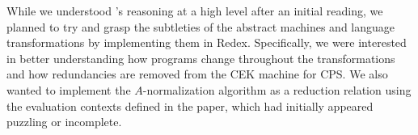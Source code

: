 \documentclass[11pt]{article}
\begin{document}



While we understood \citeauthor{Flanagan:1993fk}'s reasoning at a high level
after an initial reading, we planned to try and grasp the subtleties of the
abstract machines and language transformations by implementing them in Redex.
Specifically, we were interested in better understanding how programs change
throughout the transformations and how redundancies are removed from the
CEK machine for CPS. We also wanted to implement the $A$-normalization
algorithm as a reduction relation using the evaluation contexts defined in the
paper, which had initially appeared puzzling or incomplete.

\end{document}
